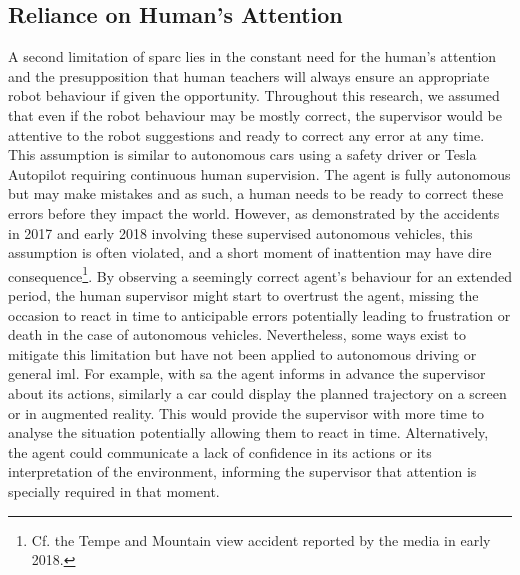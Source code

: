 \subsection{Reliance on Human's Attention}
A second limitation of \gls{sparc} lies in the constant need for the human's attention and the presupposition that human teachers will always ensure an appropriate robot behaviour if given the opportunity. Throughout this research, we assumed that even if the robot behaviour may be mostly correct, the supervisor would be attentive to the robot suggestions and ready to correct any error at any time. This assumption is similar to autonomous cars using a safety driver or Tesla Autopilot requiring continuous human supervision. The agent is fully autonomous but may make mistakes and as such, a human needs to be ready to correct these errors before they impact the world. However, as demonstrated by the accidents in 2017 and early 2018 involving these supervised autonomous vehicles, this assumption is often violated, and a short moment of inattention may have dire consequence\footnote{Cf. the Tempe and Mountain view accident reported by the media in early 2018.\label{foot:disc_danger}}. By observing a seemingly correct agent's behaviour for an extended period, the human supervisor might start to overtrust the agent, missing the occasion to react in time to anticipable errors potentially leading to frustration or death in the case of autonomous vehicles. Nevertheless, some ways exist to mitigate this limitation but have not been applied to autonomous driving or general \gls{iml}. For example, with \gls{sa} the agent informs in advance the supervisor about its actions, similarly a car could display the planned trajectory on a screen or in augmented reality. This would provide the supervisor with more time to analyse the situation potentially allowing them to react in time. Alternatively, the agent could communicate a lack of confidence in its actions or its interpretation of the environment, informing the supervisor that attention is specially required in that moment.

